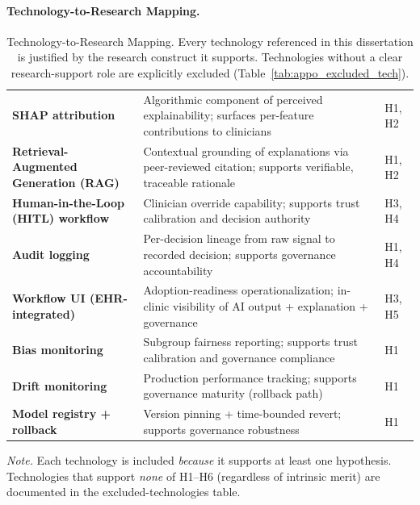\paragraph{Technology-to-Research Mapping.}




{\tablestripes\tablefontsize
{}
\begin{xltabular}{\textwidth}{@{} >{\raggedright\arraybackslash}p{4.6cm} p{8.8cm} >{\centering\arraybackslash}p{1.0cm} @{}}
\caption[Technology-to-Research Mapping]{Technology-to-Research Mapping. Every technology referenced in this dissertation is justified by the research construct it supports. Technologies without a clear research-support role are explicitly excluded (Table~\ref{tab:appo_excluded_tech}).}\label{tab:appo_tech_research_map} \\
\toprule
{} &  &  \\
\midrule
\endfirsthead
\endhead
\bottomrule
\endlastfoot
\textbf{SHAP attribution}        & Algorithmic component of perceived explainability; surfaces per-feature contributions to clinicians            & H1, H2 \\
\textbf{Retrieval-Augmented Generation (RAG)} & Contextual grounding of explanations via peer-reviewed citation; supports verifiable, traceable rationale & H1, H2 \\
\textbf{Human-in-the-Loop (HITL) workflow} & Clinician override capability; supports trust calibration and decision authority           & H3, H4 \\
\textbf{Audit logging}           & Per-decision lineage from raw signal to recorded decision; supports governance accountability                  & H1, H4 \\
\textbf{Workflow UI (EHR-integrated)} & Adoption-readiness operationalization; in-clinic visibility of AI output + explanation + governance        & H3, H5 \\
\textbf{Bias monitoring}         & Subgroup fairness reporting; supports trust calibration and governance compliance                              & H1 \\
\textbf{Drift monitoring}        & Production performance tracking; supports governance maturity (rollback path)                                   & H1 \\
\textbf{Model registry + rollback} & Version pinning + time-bounded revert; supports governance robustness                                          & H1 \\
\end{xltabular}}
\vspace{0.4em}
\noindent\textit{Note.} Each technology is included \emph{because} it supports at least one hypothesis. Technologies that support \emph{none} of H1--H6 (regardless of intrinsic merit) are documented in the excluded-technologies table.

